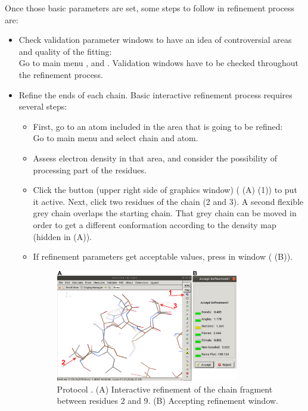 \begin{itemize}
  Once those basic parameters are set, some steps to follow in refinement process are:
  \begin{itemize}
     \item Check validation parameter windows to have an idea of controversial areas and quality of the fitting:\\
     Go to \coot main menu ,  and . Validation windows have to be checked throughout the refinement process.
     \item Refine the ends of each chain. Basic interactive refinement process requires several steps:
      \begin{itemize}
      \item First, go to an atom included in the area that is going to be refined:\\
      Go to \coot main menu  and select chain and atom.
      \item Assess electron density in that area, and consider the possibility of processing part of the residues.
      \item Click the button  (upper right side of \coot graphics window)  ( (A) (1)) to put it active. Next, click two residues of the chain (2 and 3). A second flexible grey chain overlaps the starting chain. That grey chain can be moved in order to get a different conformation according to the density map (hidden in  (A)). 
      \item If refinement parameters get acceptable values, press  in  window ( (B)).
     
      \begin{figure}[H]
       \centering 
       \captionsetup{width=.7\linewidth} 
       \includegraphics[width=0.80\textwidth]{Images_appendix/Fig122.pdf}
       \caption{Protocol . (A) Interactive refinement of the chain fragment between residues 2 and 9. (B) Accepting refinement window.}
       \label{fig:app_protocol_coot_4}
      \end{figure}
     \end{itemize} 
     

\end{itemize}
\end{itemize}
